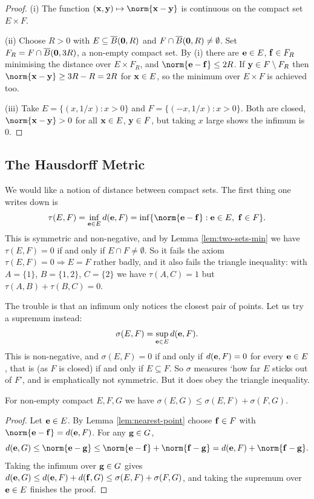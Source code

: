 \documentclass[a4paper]{scrartcl}
\begin{document}
\begin{proof}
	(i) The function $(\vv x,\vv y)\mapsto \norm{\vv x-\vv y}$ is continuous on the compact set $E\times F$.

	(ii) Choose $R>0$ with $E \subseteq \overline{B}(\mathbf{0},R)$ and $F \cap \overline{B}(\mathbf{0},R)\neq\emptyset$. Set $F_R = F\cap\overline{B}(\mathbf{0},3R)$, a non-empty compact set. By (i) there are $\mathbf{e}\in E$, $\mathbf{f}\in F_R$ minimising the distance over $E\times F_R$, and $\norm{\vv e - \vv f}\leq 2R$. If $\mathbf{y} \in F\setminus F_R$ then $\norm{\vv x-\vv y}\geq 3R - R = 2R$ for $\mathbf{x} \in E$, so the minimum over $E\times F$ is achieved too.

	(iii) Take $E = \{(x,1/x):x>0\}$ and $F = \{(-x,1/x):x>0\}$. Both are closed, $\norm{\vv x -\vv y}>0$ for all $\mathbf{x}\in E$, $\mathbf{y} \in F$, but taking $x$ large shows the infimum is $0$.
\end{proof}

\subsection{The Hausdorff Metric}

We would like a notion of distance between compact sets. The first thing one writes down is
$$\tau(E,F) = \inf_{\vv e\in E}d(\vv e,F) = \inf\{\norm{\vv e-\vv f} : \vv e\in E,\ \vv f\in F\}.$$
This is symmetric and non-negative, and by Lemma \ref{lem:two-sets-min} we have $\tau(E,F)=0$ if and only if $E\cap F\neq\emptyset$. So it fails the axiom $\tau(E,F)=0 \Rightarrow E=F$ rather badly, and it also fails the triangle inequality: with $A = \{1\}$, $B = \{1,2\}$, $C=\{2\}$ we have $\tau(A,C)=1$ but $\tau(A,B)+\tau(B,C)=0$.

The trouble is that an infimum only notices the closest pair of points. Let us try a supremum instead:
$$\sigma(E,F) = \sup_{\mathbf{e}\in E}d(\mathbf{e},F).$$
This is non-negative, and $\sigma(E,F)=0$ if and only if $d(\mathbf{e},F)=0$ for every $\mathbf{e}\in E$, that is (as $F$ is closed) if and only if $E \subseteq F$. So $\sigma$ measures `how far $E$ sticks out of $F$', and is emphatically not symmetric. But it does obey the triangle inequality.

\begin{lemma}\label{lem:sigma-triangle}
	For non-empty compact $E,F,G$ we have $\sigma(E,G)\leq\sigma(E,F)+\sigma(F,G)$.
\end{lemma}

\begin{proof}
	Let $\mathbf{e}\in E$. By Lemma \ref{lem:nearest-point} choose $\mathbf{f}\in F$ with $\norm{\vv e -\vv f} = d(\vv e,F)$. For any $\mathbf{g}\in G$,
	$$d(\vv e,G) \leq \norm{\vv e-\vv g}\leq\norm{\vv e-\vv f}+\norm{\vv f-\vv g} = d(\vv e,F)+\norm{\vv f-\vv g}.$$
	Taking the infimum over $\mathbf{g}\in G$ gives $d(\mathbf{e},G)\leq d(\mathbf{e},F)+d(\mathbf{f},G) \leq \sigma(E,F)+\sigma(F,G)$, and taking the supremum over $\mathbf{e} \in E$ finishes the proof.
\end{proof}
\end{document}
